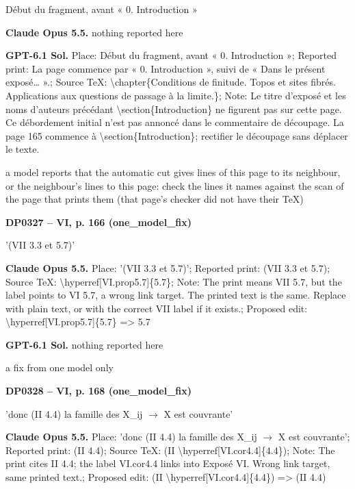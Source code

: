 Début du fragment, avant « 0. Introduction »\par
\textbf{Claude Opus 5.5.} nothing reported here\par
\textbf{GPT-6.1 Sol.} Place: Début du fragment, avant « 0. Introduction »; Reported print: La page commence par « 0. Introduction », suivi de « Dans le présent exposé… ».; Source TeX: \textbackslash{}chapter\{Conditions de finitude. Topos et sites fibrés. Applications aux questions de passage à la limite.\}; Note: Le titre d’exposé et les noms d’auteurs précédant \textbackslash{}section\{Introduction\} ne figurent pas sur cette page. Ce débordement initial n’est pas annoncé dans le commentaire de découpage. La page 165 commence à \textbackslash{}section\{Introduction\}; rectifier le découpage sans déplacer le texte.\par
a model reports that the automatic cut gives lines of this page to its neighbour, or the neighbour's lines to this page: check the lines it names against the scan of the page that prints them (that page's checker did not have their TeX)\par
\par\noindent\hypertarget{DP0327}{}\textbf{DP0327 -- VI, p. 166 (one\_model\_fix)}\par
'(VII 3.3 et 5.7)'\par
\textbf{Claude Opus 5.5.} Place: '(VII 3.3 et 5.7)'; Reported print: (VII 3.3 et 5.7); Source TeX: \textbackslash{}hyperref[VI.prop5.7]\{5.7\}; Note: The print means VII 5.7, but the label points to VI 5.7, a wrong link target. The printed text is the same. Replace with plain text, or with the correct VII label if it exists.; Proposed edit: \textbackslash{}hyperref[VI.prop5.7]\{5.7\} =\allowbreak > 5.7\par
\textbf{GPT-6.1 Sol.} nothing reported here\par
a fix from one model only\par
\par\noindent\hypertarget{DP0328}{}\textbf{DP0328 -- VI, p. 168 (one\_model\_fix)}\par
'donc (II 4.4) la famille des X\_ij \ensuremath{\to} X est couvrante'\par
\textbf{Claude Opus 5.5.} Place: 'donc (II 4.4) la famille des X\_ij \ensuremath{\to} X est couvrante'; Reported print: (II 4.4); Source TeX: (II \textbackslash{}hyperref[VI.cor4.4]\{4.4\}); Note: The print cites II 4.4; the label VI.cor4.4 links into Exposé VI. Wrong link target, same printed text.; Proposed edit: (II \textbackslash{}hyperref[VI.cor4.4]\{4.4\}) =\allowbreak > (II 4.4)\par

